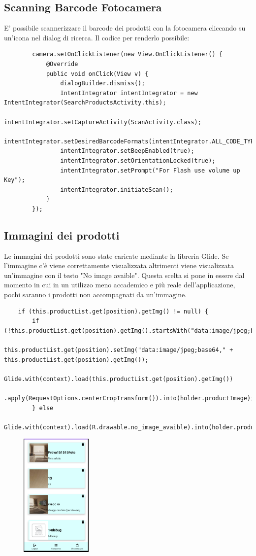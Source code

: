 \documentclass[12pt]{article}
\begin{document}
    \subsection{Scanning Barcode Fotocamera}
    E' possibile scannerizzare il barcode dei prodotti con la fotocamera cliccando su un'icona nel dialog di ricerca.
    Il codice per renderlo possibile:
    \begin{lstlisting}
        camera.setOnClickListener(new View.OnClickListener() {
            @Override
            public void onClick(View v) {
                dialogBuilder.dismiss();
                IntentIntegrator intentIntegrator = new IntentIntegrator(SearchProductsActivity.this);
                intentIntegrator.setCaptureActivity(ScanActivity.class);
                intentIntegrator.setDesiredBarcodeFormats(intentIntegrator.ALL_CODE_TYPES);
                intentIntegrator.setBeepEnabled(true);
                intentIntegrator.setOrientationLocked(true);
                intentIntegrator.setPrompt("For Flash use volume up Key");
                intentIntegrator.initiateScan();
            }
        });
    \end{lstlisting}
    \subsection{Immagini dei prodotti}
    Le immagini dei prodotti sono state caricate mediante la libreria Glide. Se l'immagine c'è viene correttamente visualizzata
    altrimenti viene visualizzata un'immagine con il testo "No image avaible". Questa scelta si pone in essere dal momento in cui
    in un utilizzo meno accademico e più reale dell'applicazione, pochi saranno i prodotti non accompagnati da un'immagine.
    \begin{lstlisting}
    if (this.productList.get(position).getImg() != null) {
        if (!this.productList.get(position).getImg().startsWith("data:image/jpeg;base64,"))
            this.productList.get(position).setImg("data:image/jpeg;base64," + this.productList.get(position).getImg());
        Glide.with(context).load(this.productList.get(position).getImg())
        .apply(RequestOptions.centerCropTransform()).into(holder.productImage);
        } else
        Glide.with(context).load(R.drawable.no_image_avaible).into(holder.productImage);
    \end{lstlisting}
    \begin{figure}
        \includegraphics[width=3.5cm]{img/shoppinglist.PNG}
    \end{figure}
\end{document}
